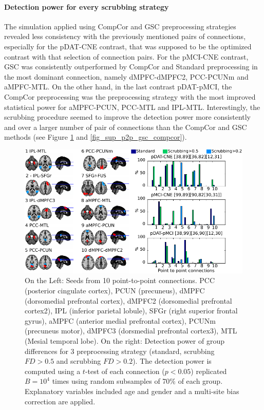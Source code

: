 \paragraph{Detection power for every scrubbing strategy}
The simulation applied using CompCor and GSC preprocessing strategies revealed less consistency with the previously mentioned pairs of connections, especially for the pDAT-CNE contrast, that was supposed to be the optimized contrast with that selection of connection pairs. For the pMCI-CNE contrast, GSC was consistently outperformed by CompCor and Standard preprocessing in the most dominant connection, namely dMPFC-dMPFC2, PCC-PCUNm and aMPFC-MTL. On the other hand, in the last contrast pDAT-pMCI, the CompCor preprocessing was the preprocessing strategy with the most improved statistical power for aMPFC-PCUN, PCC-MTL and IPL-MTL. Interestingly, the scrubbing procedure seemed to improve the detection power more consistently and over a larger number of pair of connections than the CompCor and GSC methods (see Figure \ref{fig_p2p} and \ref{fig_sup_p2p_gsc_compcor}).


\begin{figure}[H]
\begin{center}
\includegraphics[width=\linewidth]{../figures/p2pdetection.pdf}
\end{center}
\caption[Detection power with Scrubbing]{
On the Left: Seeds from 10 point-to-point connections. PCC (posterior cingulate cortex), PCUN (precuneus), dMPFC (dorsomedial prefrontal cortex), dMPFC2 (dorsomedial prefrontal cortex2), IPL (inferior parietal lobule), SFGr (right superior frontal gyrus), aMPFC (anterior medial prefrontal cortex), PCUNm (precuneus motor), dMPFC3 (dorsmedial prefrontal cortex3), MTL (Mesial temporal lobe). On the right: Detection power of group differences for 3 preprocessing strategy (standard, scrubbing $FD>0.5$ and scrubbing $FD >0.2$). The detection power is computed using a $t$-test of each connection ($p<0.05$) replicated $B=10^4$ times using random subsamples of 70\% of each group. Explanatory variables included age and gender and a multi-site bias correction are applied.
}
\label{fig_p2p}
\end{figure}

